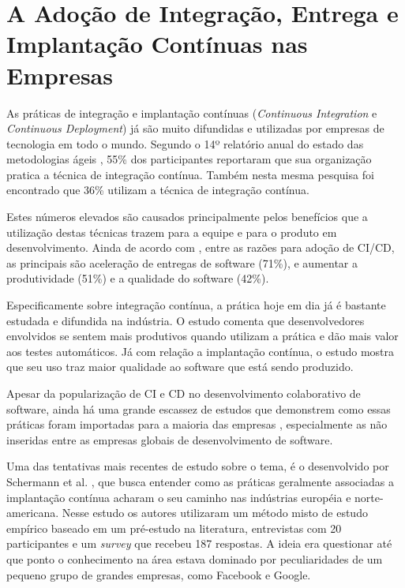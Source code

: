 \section{A Adoção de Integração, Entrega e Implantação Contínuas nas Empresas}

As práticas de integração e implantação contínuas (\emph{Continuous Integration} e \emph{Continuous Deployment}) já são muito difundidas e utilizadas por empresas de tecnologia em todo o mundo. Segundo o 14º relatório anual do estado das metodologias ágeis \cite{stateAgileReport2020}, 55\% dos participantes reportaram que sua organização pratica a técnica de integração contínua. Também nesta mesma pesquisa foi encontrado que 36\% utilizam a técnica de integração contínua. 

Estes números elevados são causados principalmente pelos benefícios que a utilização destas técnicas trazem para a equipe e para o produto em desenvolvimento. Ainda de acordo com \cite{stateAgileReport2020}, entre as razões para adoção de CI/CD, as principais são aceleração de entregas de software (71\%), e aumentar a produtividade (51\%) e a qualidade do software (42\%). 

Especificamente sobre integração contínua, a prática hoje em dia já é bastante estudada e difundida na indústria. O estudo \cite{hilton2016} comenta que desenvolvedores envolvidos se sentem mais produtivos quando utilizam a prática e dão mais valor aos testes automáticos.  Já com relação a implantação contínua, o estudo \cite{savor2015} mostra que seu uso traz maior qualidade ao software que está sendo produzido. 

Apesar da popularização de CI e CD no desenvolvimento colaborativo de software, ainda há uma grande escassez de estudos que demonstrem como essas práticas foram importadas para a maioria das empresas \cite{empiricalStudy2016}, especialmente as não inseridas entre as empresas globais de desenvolvimento de software.

Uma das tentativas mais recentes de estudo sobre o tema, é o desenvolvido por Schermann et al. \cite{empiricalStudy2016}, que busca entender como as práticas geralmente associadas a implantação contínua acharam o seu caminho nas indústrias européia e norte-americana. Nesse estudo os autores utilizaram um método misto de estudo empírico baseado em um pré-estudo na literatura, entrevistas com 20 participantes e um \emph{survey} que recebeu 187 respostas. A ideia era questionar até que ponto o conhecimento na área estava dominado por peculiaridades de um pequeno grupo de grandes empresas, como Facebook e Google.

